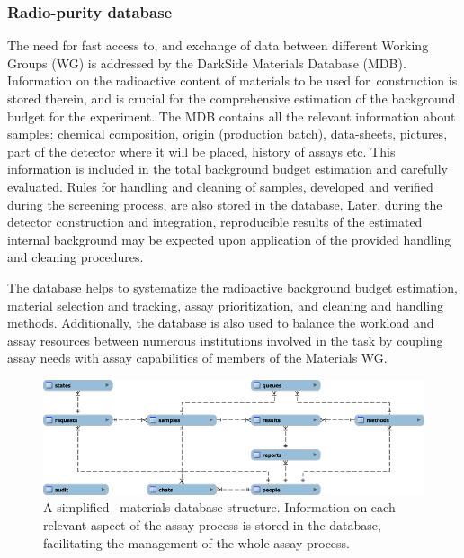 \subsubsection{Radio-purity database}
\label{sec:Mat-DB}

The need for fast access to, and exchange of data between different Working Groups (WG) is addressed by the DarkSide Materials Database (MDB). Information on the radioactive content of materials to be used for \DSks\,construction is stored therein, and is crucial for the comprehensive estimation of the background budget for the experiment. The MDB contains all the relevant information about samples: chemical composition, origin (production batch), data-sheets, pictures, part of the detector where it will be placed, history of assays etc. This information is included in the total background budget estimation and carefully evaluated. Rules for handling and cleaning of samples, developed and verified during the screening process, are also stored in the database. Later, during the detector construction and integration, reproducible results of the estimated internal background may be expected upon application of the provided handling and cleaning procedures.

The database helps to systematize the radioactive background budget estimation, material selection and tracking, assay prioritization, and cleaning and handling methods. Additionally, the database is also used to balance the workload and assay resources between numerous institutions involved in the task by coupling assay needs with assay capabilities of members of the Materials WG.

\begin{figure}[!t]
\center\includegraphics[width=\textwidth]{./Figures/mdb_structure.png}
\caption[\DSks\ materials database structure]{A simplified \DSks\ materials database structure. Information on each relevant aspect of the assay process is stored in the database, facilitating the management of the whole assay process.}
\label{fig:mdb_structure}
\end{figure} 

